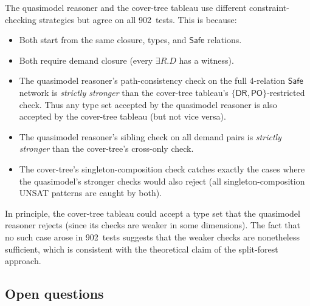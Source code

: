 \documentclass[a4paper,11pt]{article}
\theoremstyle{definition}
\newcommand{\DR}{\ensuremath{\mathsf{DR}}}
\newcommand{\PO}{\ensuremath{\mathsf{PO}}}
\newcommand{\Safe}{\ensuremath{\mathsf{Safe}}}
\begin{document}
The quasimodel reasoner and the cover-tree tableau use different
constraint-checking strategies but agree on all 902~tests.
This is because:
\begin{itemize}[nosep]
  \item Both start from the same closure, types, and $\Safe$
    relations.
  \item Both require demand closure (every $\exists R.D$ has a
    witness).
  \item The quasimodel reasoner's path-consistency check on the
    full 4-relation $\Safe$ network is \emph{strictly stronger}
    than the cover-tree tableau's $\{\DR,\PO\}$-restricted check.
    Thus any type set accepted by the quasimodel reasoner is
    also accepted by the cover-tree tableau (but not vice versa).
  \item The quasimodel reasoner's sibling check on all demand
    pairs is \emph{strictly stronger} than the cover-tree's
    cross-only check.
  \item The cover-tree's singleton-composition check catches
    exactly the cases where the quasimodel's stronger checks
    would also reject (all singleton-composition UNSAT patterns
    are caught by both).
\end{itemize}

In principle, the cover-tree tableau could accept a type set that
the quasimodel reasoner rejects (since its checks are weaker in
some dimensions).  The fact that no such case arose in 902~tests
suggests that the weaker checks are nonetheless sufficient, which
is consistent with the theoretical claim of the split-forest
approach.

\subsection{Open questions}
\end{document}
